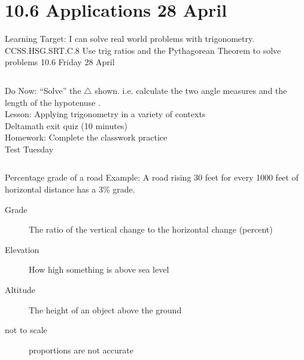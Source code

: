 \documentclass[onlytextwidth, aspectratio=169]{beamer}
\begin{document}
\section{10.6 Applications \hfill 28 April \,}
\begin{frame}{Learning Target: I can solve real world problems with trigonometry.}
  {CCSS.HSG.SRT.C.8 Use trig ratios and the Pythagorean Theorem to solve problems \hfill \alert{10.6 Friday 28 April}}
  \begin{columns}
    Do Now: ``Solve'' the $\triangle$ shown. i.e. calculate the two angle measures and the length of the hypotenuse . \\[0.5cm]
    Lesson: Applying trigonometry in a variety of contexts \\
    \alert{Deltamath exit quiz} (10 minutes) \\[0.5cm]
    Homework: Complete the classwork practice \\
    \alert{Test Tuesday}
    \begin{flushright}
    \end{flushright}
  \end{columns}
\end{frame}

\begin{frame}{Percentage grade of a road}
  Example: A road rising 30 feet for every 1000 feet of horizontal distance has a 3\% grade. \\[0.5cm]
  \begin{center}
  \end{center}
  \begin{description}
    \item[Grade] The ratio of the vertical change to the horizontal change (percent)
    \item[Elevation] How high something is above sea level
    \item[Altitude] The height of an object above the ground
    \item[not to scale] proportions are not accurate
  \end{description}
\end{frame}
\end{document}
